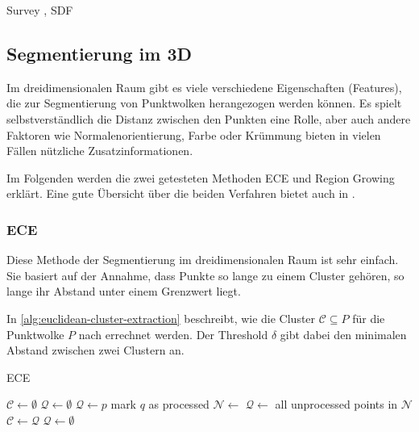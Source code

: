 Survey \cite{shamir2008survey}, SDF \cite{shapira2008consistent}


\subsection{Segmentierung im 3D}
\label{subsec:3d-segmentation}

Im dreidimensionalen Raum gibt es viele verschiedene Eigenschaften (Features), die zur Segmentierung von Punktwolken herangezogen werden können.
Es spielt selbstverständlich die Distanz zwischen den Punkten eine Rolle, aber auch andere Faktoren wie Normalenorientierung, Farbe oder Krümmung bieten in vielen Fällen nützliche Zusatzinformationen.

Im Folgenden werden die zwei getesteten Methoden \ac{ECE} und Region Growing erklärt.
Eine gute Übersicht über die beiden Verfahren bietet auch \citeauthor{RusuDoctoralDissertation} in \cite[88--93]{RusuDoctoralDissertation}.

\subsubsection{\acl{ECE}}
\label{subsubsec:euclidean-cluster-extraction}

Diese Methode der Segmentierung im dreidimensionalen Raum ist sehr einfach.
Sie basiert auf der Annahme, dass Punkte so lange zu einem Cluster gehören, so lange ihr Abstand unter einem Grenzwert liegt.

In \autoref{alg:euclidean-cluster-extraction} beschreibt, wie die Cluster $\mathcal{C} \subseteq P$ für die Punktwolke $P$ nach \cite[89--90]{RusuDoctoralDissertation} errechnet werden.
Der Threshold $\delta$ gibt dabei den minimalen Abstand zwischen zwei Clustern an.

\begin{algorithm}
\caption{\acl{ECE}}
\label{alg:euclidean-cluster-extraction}
\begin{algorithmic}
\State $\mathcal{C} \gets \emptyset$
\State $\mathcal{Q} \gets \emptyset$
	\State $\mathcal{Q} \gets p$
		\State mark $q$ as processed
		\State $\mathcal{N} \gets$ 
		\State $\mathcal{Q} \gets$ all unprocessed points in $\mathcal{N}$
	\EndFor
	\State $\mathcal{C} \gets \mathcal{Q}$
	\State $\mathcal{Q} \gets \emptyset$
\EndFor
\State {}
\end{algorithmic}
\end{algorithm}

